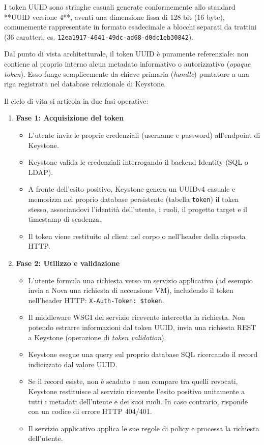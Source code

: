 \documentclass[11pt, a4paper]{article}
\begin{document}
I token UUID sono stringhe casuali generate conformemente allo standard **UUID versione 4**, aventi una dimensione fissa di 128 bit (16 byte), comunemente rappresentate in formato esadecimale a blocchi separati da trattini (36 caratteri, es. \texttt{12ea1917-4641-49dc-ad68-d0dc1eb30842}).

Dal punto di vista architetturale, il token UUID è puramente referenziale: non contiene al proprio interno alcun metadato informativo o autorizzativo (\emph{opaque token}). Esso funge semplicemente da chiave primaria (\emph{handle}) puntatore a una riga registrata nel database relazionale di Keystone.

Il ciclo di vita si articola in due fasi operative:

\begin{enumerate}
    \item \textbf{Fase 1: Acquisizione del token}
    \begin{itemize}[noitemsep]
        \item L'utente invia le proprie credenziali (username e password) all'endpoint di Keystone.
        \item Keystone valida le credenziali interrogando il backend Identity (SQL o LDAP).
        \item A fronte dell'esito positivo, Keystone genera un UUIDv4 casuale e memorizza nel proprio database persistente (tabella \texttt{token}) il token stesso, associandovi l'identità dell'utente, i ruoli, il progetto target e il timestamp di scadenza.
        \item Il token viene restituito al client nel corpo o nell'header della risposta HTTP.
    \end{itemize}
    \item \textbf{Fase 2: Utilizzo e validazione}
    \begin{itemize}[noitemsep]
        \item L'utente formula una richiesta verso un servizio applicativo (ad esempio invia a Nova una richiesta di accensione VM), includendo il token nell'header HTTP: \texttt{X-Auth-Token: \$token}.
        \item Il middleware WSGI del servizio ricevente intercetta la richiesta. Non potendo estrarre informazioni dal token UUID, invia una richiesta REST a Keystone (operazione di \emph{token validation}).
        \item Keystone esegue una query sul proprio database SQL ricercando il record indicizzato dal valore UUID.
        \item Se il record esiste, non è scaduto e non compare tra quelli revocati, Keystone restituisce al servizio ricevente l'esito positivo unitamente a tutti i metadati dell'utente e dei suoi ruoli. In caso contrario, risponde con un codice di errore HTTP 404/401.
        \item Il servizio applicativo applica le sue regole di policy e processa la richiesta dell'utente.
    \end{itemize}
\end{enumerate}
\end{document}

